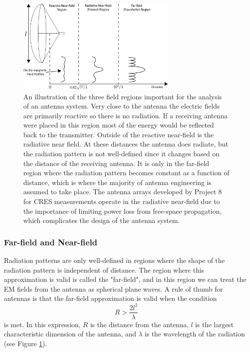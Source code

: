 \begin{figure}[htbp]
    \centering
    \includegraphics[width=0.7\textwidth]{figs/Chapter-5/230421_field_regions.png}
    \caption{An illustration of the three field regions important for the analysis of an antenna system. Very close to the antenna the electric fields are primarily reactive so there is no radiation. If a receiving antenna were placed in this region most of the energy would be reflected back to the transmitter. Outside of the reactive near-field is the radiative near field. At these distances the antenna does radiate, but the radiation pattern is not well-defined since it changes based on the distance of the receiving antenna. It is only in the far-field region where the radiation pattern becomes constant as a function of distance, which is where the majority of antenna engineering is assumed to take place. The antenna arrays developed by Project 8 for CRES measurements operate in the radiative near-field due to the importance of limiting power loss from free-space propagation, which complicates the design of the antenna system.}
    \label{fig:field-regions}
\end{figure}

\subsubsection{Far-field and Near-field}
Radiation patterns are only well-defined in regions where the shape of the radiation pattern is independent of distance. The region where this approximation is valid is called the "far-field", and in this region we can treat the EM fields from the antenna as spherical plane waves. A rule of thumb for antennas is that the far-field approximation is valid when the condition
\begin{equation}
    R > \frac{2l^2}{\lambda}
\end{equation}
is met. In this expression, $R$ is the distance from the antenna, $l$ is the largest characteristic dimension of the antenna, and $\lambda$ is the wavelength of the radiation (see Figure \ref{fig:field-regions}). 

